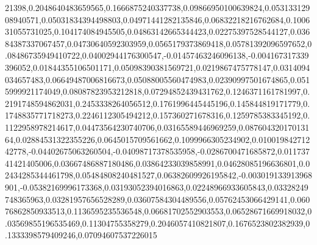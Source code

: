 21398,0.2048640483659565,0.1666875240337738,0.09866950100639824,0.05313312908940571,0.05031834394498803,0.04971441282135846,0.06832218216762684,0.100631055731025,0.104174084945505,0.04863142665344423,0.02275397528544127,0.03684387337067457,0.04730640592303959,0.0565179373869418,0.05781392096597652,0.08486735949410722,0.04002944176300547,-0.01457463246096138,-0.004167317339396052,0.01844355106501171,0.05098390381569721,0.0219867475778147,0.0314094034657483,0.06649487006816673,0.05088005560474983,0.02390997501674865,0.0515999921174049,0.08087823953212818,0.07294852439431762,0.1246371161781997,0.2191748594862031,0.2453338264056512,0.1761996445445196,0.145844819171779,0.1748835771718273,0.2246112305494212,0.157360271678316,0.1259785383345192,0.1122958978214617,0.04473564230740706,0.03165589446969259,0.08760432017013164,0.02884531322355226,0.0645015709561662,0.1099966305234902,0.01001984271242778,-0.04402675063260504,-0.04098717378535958,-0.0286700471685872,0.01173741421405006,0.03667486887180486,0.03864233039858991,0.04628085196636801,0.02434285344461798,0.05484808240481527,0.06382609926195842,-0.003019133913968901,-0.05382169996173368,0.03193052394016863,0.02248966933605843,0.03328249748365963,0.03281957656528289,0.03607584304489556,0.05762453066429141,0.06076862850933513,0.1136595235536548,0.06681702552903553,0.06528671669918032,0.03569855196535469,0.11304755358279,0.2046057410821807,0.1676523802382939,0.1333398579409246,0.07094607537226015
